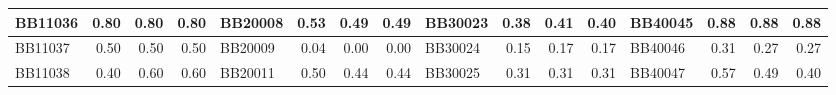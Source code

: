 \begin{table}[!htbp]
\begin{adjustwidth}{-0cm}{}
\begin{tabular}{|l|r|r|r||l|r|r|r||l|r|r|r||l|r|r|r|}
		\hline
		BB11036 & \cellcolor[rgb]{ .988,  1,  .992}0.80 & \cellcolor[rgb]{ .988,  1,  .992}0.80 & \cellcolor[rgb]{ .988,  1,  .992}0.80 & BB20008 & \cellcolor[rgb]{ .988,  1,  .992}0.53 & \cellcolor[rgb]{ .384,  .745,  .478}0.49 & \cellcolor[rgb]{ .384,  .745,  .478}0.49 & BB30023 & \cellcolor[rgb]{ .384,  .745,  .478}0.38 & \cellcolor[rgb]{ .988,  1,  .992}0.41 & \cellcolor[rgb]{ .804,  .922,  .835}0.40 & \multicolumn{1}{l|}{BB40045} & \multicolumn{1}{r|}{\cellcolor[rgb]{ .988,  1,  .992}0.88} & \multicolumn{1}{r|}{\cellcolor[rgb]{ .988,  1,  .992}0.88} & \multicolumn{1}{r|}{\cellcolor[rgb]{ .988,  1,  .992}0.88} \\
		\hline
		BB11037 & \cellcolor[rgb]{ .988,  1,  .992}0.50 & \cellcolor[rgb]{ .988,  1,  .992}0.50 & \cellcolor[rgb]{ .988,  1,  .992}0.50 & BB20009 & \cellcolor[rgb]{ .988,  1,  .992}0.04 & \cellcolor[rgb]{ .384,  .745,  .478}0.00 & \cellcolor[rgb]{ .384,  .745,  .478}0.00 & BB30024 & \cellcolor[rgb]{ .384,  .745,  .478}0.15 & \cellcolor[rgb]{ .988,  1,  .992}0.17 & \cellcolor[rgb]{ .988,  1,  .992}0.17 & \multicolumn{1}{l|}{BB40046} & \multicolumn{1}{r|}{\cellcolor[rgb]{ .988,  1,  .992}0.31} & \multicolumn{1}{r|}{\cellcolor[rgb]{ .384,  .745,  .478}0.27} & \multicolumn{1}{r|}{\cellcolor[rgb]{ .384,  .745,  .478}0.27} \\
		\hline
		BB11038 & \cellcolor[rgb]{ .384,  .745,  .478}0.40 & \cellcolor[rgb]{ .988,  1,  .992}0.60 & \cellcolor[rgb]{ .988,  1,  .992}0.60 & BB20011 & \cellcolor[rgb]{ .988,  1,  .992}0.50 & \cellcolor[rgb]{ .384,  .745,  .478}0.44 & \cellcolor[rgb]{ .384,  .745,  .478}0.44 & BB30025 & \cellcolor[rgb]{ .988,  1,  .992}0.31 & \cellcolor[rgb]{ .988,  1,  .992}0.31 & \cellcolor[rgb]{ .988,  1,  .992}0.31 & \multicolumn{1}{l|}{BB40047} & \multicolumn{1}{r|}{\cellcolor[rgb]{ .988,  1,  .992}0.57} & \multicolumn{1}{r|}{\cellcolor[rgb]{ .706,  .878,  .753}0.49} & \multicolumn{1}{r|}{\cellcolor[rgb]{ .384,  .745,  .478}0.40} \\
		\cline{1-12}    \end{tabular}%
	\label{tab:obtain-single-ml}%
	\end{adjustwidth}
\end{table}%

